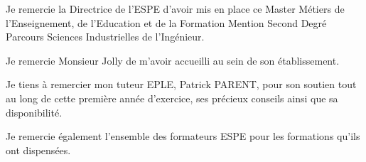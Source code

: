 
Je remercie la Directrice de l'ESPE d'avoir mis en place ce Master Métiers de l'Enseignement, de l'Education et de la Formation Mention Second Degré Parcours Sciences Industrielles de l'Ingénieur.




Je remercie Monsieur Jolly de m'avoir accueilli au sein de son établissement.


Je tiens à remercier mon tuteur EPLE, Patrick PARENT, pour son soutien tout au long de cette première année d'exercice, ses précieux conseils ainsi que sa disponibilité.

Je remercie également l'ensemble des formateurs ESPE pour les formations qu'ils ont dispensées.



